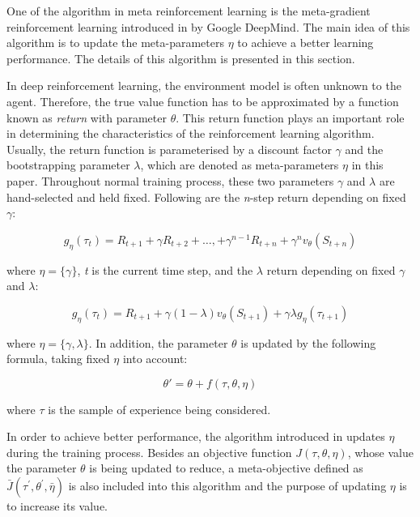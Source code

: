 One of the algorithm in meta reinforcement learning is the meta-gradient reinforcement learning introduced in \cite{meta-gradient} by Google DeepMind. The main idea of this algorithm is to update the meta-parameters $\eta$ to achieve a better learning performance. The details of this algorithm is presented in this section.

\par
In deep reinforcement learning, the environment model is often unknown to the agent. Therefore, the true value function has to be approximated by a function known as \textit{return} with parameter $\theta$. This return function plays an important role in determining the characteristics of the reinforcement learning algorithm. Usually, the return function is parameterised by a discount factor $\gamma$ and the bootstrapping parameter $\lambda$, which are denoted as meta-parameters $\eta$ in this paper. Throughout normal training process, these two parameters $\gamma$ and $\lambda$ are hand-selected and held fixed. Following are the \textit{n}-step return\cite{n-step-return} depending on fixed $\gamma$:

\[g_{\eta}\left(\tau_{t}\right)=R_{t+1}+\gamma R_{t+2}+\ldots,+\gamma^{n-1} R_{t+n}+\gamma^{n} v_{\theta}\left(S_{t+n}\right)\]

where $\eta = \{\gamma\}$, \textit{t} is the current time step, and the $\lambda$ return\cite{lambda-return} depending on fixed $\gamma$ and $\lambda$:

\[g_{\eta}\left(\tau_{t}\right)=R_{t+1}+\gamma(1-\lambda) v_{\theta}\left(S_{t+1}\right)+\gamma \lambda g_{\eta}\left(\tau_{t+1}\right)\]

where $\eta = \{\gamma, \lambda\}$. In addition, the parameter $\theta$ is updated by the following formula, taking fixed $\eta$ into account:

\[\theta' = \theta + f(\tau, \theta, \eta)\]

where $\tau$ is the sample of experience being considered.

\par
In order to achieve better performance, the algorithm introduced in \cite{meta-gradient} updates $\eta$ during the training process. Besides an objective function $J(\tau, \theta, \eta)$, whose value the parameter $\theta$ is being updated to reduce, a meta-objective defined as $\bar{J}\left(\tau^{\prime}, \theta^{\prime}, \bar{\eta}\right)$ is also included into this algorithm and the purpose of updating $\eta$ is to increase its value.

